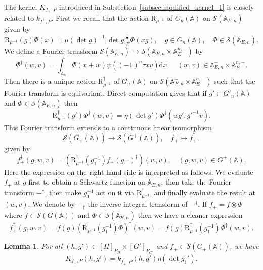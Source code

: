 \documentclass[letterpaper,11pt]{amsart}
\newcommand{\bA}{\mathbb{A}}
\newcommand{\cS}{\mathcal{S}}
\newcommand{\rd}{\mathrm{d}}
\newcommand{\<}{\negthickspace}
\providecommand{\abs}[1]{\lvert#1\rvert}
\theoremstyle{definition}
\theoremstyle{plain}
\newtheorem{lemma}[definition]{Lemma}
\theoremstyle{remark}
\numberwithin{equation}{section}
\begin{document}
The kernel $K_{f_+, P}$ introduced in
Subsection~\ref{subsec:modified_kernel_1} is closely related to $k_{f^+, P}$. First we recall
that the action $\mathrm{R}_{\mu^{-1}}$ of $G_n(\bA)$ on $\cS(\bA_{E, n})$ given
by
    \[
    \mathrm{R}_{\mu^{-1}}(g) \Phi(x) =
    \mu(\det g)^{-1} \abs{\det g}_E^{\frac{1}{2}} \Phi(xg), \quad
    g \in G_n(\bA), \quad \Phi \in \cS(\bA_{E, n}).
    \]
We define a Fourier transform $\cS(\bA_{E, n}) \to \cS(\bA_{E, n}^- \times
\bA_E^{n, -})$ by
    \begin{equation}    \label{eq:global_FT_GL}
    \Phi^\dag(w, v) = \int_{\bA_{ n}} \Phi(x+w)
    \psi((-1)^{n} \tau x v) \rd x, \quad (w, v) \in
    \bA_{E, n}^- \times \bA_E^{n, -}.
    \end{equation}
Then there is a unique action $\mathrm{R}^\dag_{\mu^{-1}}$ of $G_n(\bA)$ on
$\cS(\bA_{E, n}^- \times \bA_E^{n, -})$ such that the Fourier transform is
equivariant. Direct computation gives that if $g' \in G'_n(\bA)$ and
$\Phi \in \cS(\bA_{E, n})$ then
    \[
    \mathrm{R}_{\mu^{-1}}^{\dag}(g')\Phi^\dag(w, v) = \eta(\det g')
    \Phi^\dag(wg', g'^{-1} v).
    \]
This Fourier transform extends to a continuous linear
isomorphism
    \[
    \cS(G_+(\bA)) \to \cS(G^+(\bA)), \quad
    f_+ \mapsto f_+^\dag,
    \]
given by
    \begin{equation}    \label{eq:dag_map_global}
    f_+^\dag(g, w, v) = \left(\mathrm{R}_{\mu^{-1}}^\dag(g_1^{-1})
    f_+(g, \cdot)^\dag \right)(w, v), \quad
    (g, w, v) \in G^+(\bA).
    \end{equation}
Here the expression on the right hand side is interpreted as follows. We
evaluate $f_+$ at $g$ first to obtain a Schwartz function on $\bA_{E, n}$, then take the Fourier transform $-^\dag$, then make $g_1^{-1}$ act on it via
$\mathrm{R}_{\mu^{-1}}^\dag$, and finally evaluate the result at $(w, v)$. We denote by
$-_\dag$ the inverse integral transform of $-^\dag$. If $f_+ = f \otimes
\Phi$ where $f \in \cS(G(\bA))$ and $\Phi \in \cS(\bA_{E, n})$ then we have a
cleaner expression
    \[
    f_+^\dag(g, w, v) = f(g)
    \left( \mathrm{R}_{\mu^{-1}}(g_1^{-1}) \Phi \right)^\dag(w, v) =
    f(g)
    \mathrm{R}_{\mu^{-1}}^\dag(g_1^{-1}) \Phi^\dag(w, v).
    \]


\begin{lemma}   \label{lemma:k=K}
For all $(h, g') \in [H]_{P_H} \times [G']_{P_{G'}}$ and $f_+ \in
\cS(G_+(\bA))$, we have
    \[
    K_{f_+, P}(h, g') = k_{f_+^\dag, P}(h, g')
    \eta(\det g_1').
    \]
\end{lemma}
\end{document}
